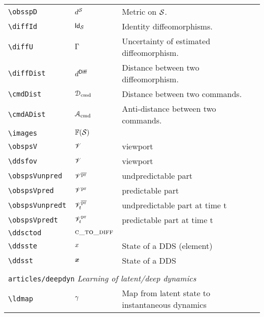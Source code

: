 \begin{longtable}{lll}
 {\color[rgb]{0.5,0.5,0.5}\texttt{\textbackslash obsspD}} & $\obsspD$ &  Metric on $\obsps$.\\ 
 {\color[rgb]{0.5,0.5,0.5}\texttt{\textbackslash diffId}} & $\diffId$ &  Identity diffeomorphisms.\\ 
 {\color[rgb]{0.5,0.5,0.5}\texttt{\textbackslash diffU}} & $\Gamma$ &  Uncertainty of estimated diffeomorphism.\\ 
 {\color[rgb]{0.5,0.5,0.5}\texttt{\textbackslash diffDist}} & $d^{\mathsf{Diff}}$ &  Distance between two diffeomorphism.\\ 
 {\color[rgb]{0.5,0.5,0.5}\texttt{\textbackslash cmdDist}} & $\mathcal{D}_{\text{cmd}}$ &  Distance between two commands.\\ 
 {\color[rgb]{0.5,0.5,0.5}\texttt{\textbackslash cmdADist}} & $\mathcal{A}_{\text{cmd}}$ &  Anti-distance between two commands.\\ 
 {\color[rgb]{0.5,0.5,0.5}\texttt{\textbackslash images}} & $\images$ & \\ 
 {\color[rgb]{0.5,0.5,0.5}\texttt{\textbackslash obspsV}} & $\mathscr{V}$ &  viewport\\ 
 {\color[rgb]{0.5,0.5,0.5}\texttt{\textbackslash ddsfov}} & $\mathscr{V}$ &  viewport\\ 
 {\color[rgb]{0.5,0.5,0.5}\texttt{\textbackslash obspsVunpred}} & $\mathscr{V}^{\overline{\text{pr}}}$ &  undpredictable part\\ 
 {\color[rgb]{0.5,0.5,0.5}\texttt{\textbackslash obspsVpred}} & $\mathscr{V}^\text{pr}$ &  predictable part \\ 
 {\color[rgb]{0.5,0.5,0.5}\texttt{\textbackslash obspsVunpredt}} & $\mathscr{V}_t^{\overline{\text{pr}}}$ &  undpredictable part at time t\\ 
 {\color[rgb]{0.5,0.5,0.5}\texttt{\textbackslash obspsVpredt}} & $\mathscr{V}_t^\text{pr}$ &  predictable part at time t\\ 
 {\color[rgb]{0.5,0.5,0.5}\texttt{\textbackslash ddsctod}} & $\textsc{c\_to\_diff}$ & \\ 
 {\color[rgb]{0.5,0.5,0.5}\texttt{\textbackslash ddsste}} & $x$ &  State of a DDS (element)\\ 
 {\color[rgb]{0.5,0.5,0.5}\texttt{\textbackslash ddsst}} & $\boldsymbol{x}$ &  State of a DDS\\ 
  &  & \\ 
 \multicolumn{3}{l}{{\color[rgb]{0.5,0.5,0.5}\texttt{articles/deepdyn}} \emph{Learning of latent/deep dynamics}}\\ 
 \hline
{\color[rgb]{0.5,0.5,0.5}\texttt{\textbackslash ldmap}} & $\gamma$ &  Map from latent state to instantaneous dynamics\\ 

\end{longtable}
